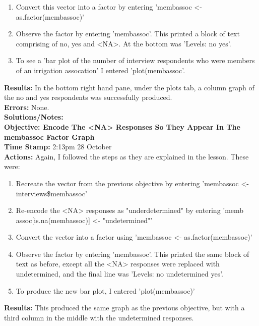 \documentclass{article}
\begin{document}
\begin{FlushLeft}
\begin{enumerate}
    \item Convert this vector into a factor by entering 'memb\textunderscore assoc \textless - as.factor(memb\textunderscore assoc)'
    \item Observe the factor by entering 'memb\textunderscore assoc'. This printed a block of text comprising of no, yes and \textless NA\textgreater{}. At the bottom was 'Levels: no yes'.
    \item To see a 'bar plot of the number of interview respondents who were members of an irrigation assocation' I entered 'plot(memb\textunderscore assoc'.
\end{enumerate}
\textbf{Results:} In the bottom right hand pane, under the plots tab, a column graph of the no and yes respondents was successfully produced.\\
\textbf{Errors:} None.\\
\textbf{Solutions/Notes:}\\
\vspace{5mm}
\textbf{Objective: Encode The \textless NA\textgreater{} Responses So They Appear In The memb\textunderscore assoc Factor Graph}\\ 
\textbf{Time Stamp:} 2:13pm 28 October\\
\textbf{Actions:} Again, I followed the steps as they are explained in the lesson. These were:
\begin{enumerate}
    \item Recreate the vector from the previous objective by entering 'memb\textunderscore assoc \textless - interviews\$memb\textunderscore assoc'
    \item Re-encode the \textless NA\textgreater{} responses as "underdetermined" by entering 'memb\textunderscore \\ assoc[is.na(memb\textunderscore assoc)] \textless - "undetermined"'
    \item Convert the vector into a factor using 'memb\textunderscore assoc \textless - as.factor(memb\textunderscore assoc)'
    \item Observe the factor by entering 'memb\textunderscore assoc'. This printed the same block of text as before, except all the \textless NA\textgreater{} responses were replaced with undetermined, and the final line was 'Levels: no undetermined yes'.
    \item To produce the new bar plot, I entered 'plot(memb\textunderscore assoc)'
\end{enumerate}
\textbf{Results:} This produced the same graph as the previous objective, but with a third column in the middle with the undetermined responses.\\

\end{FlushLeft}
\end{document}
